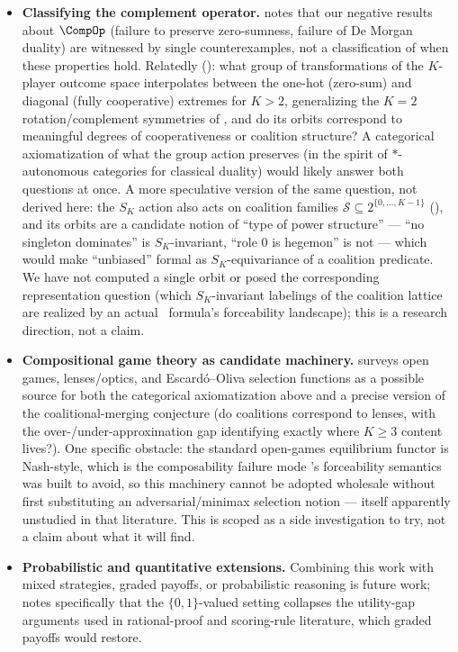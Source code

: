 \begin{itemize}
  \item \textbf{Classifying the complement operator.}
   notes that our negative results about
  $\CompOp$ (failure to preserve zero-sumness, failure of De Morgan duality)
  are witnessed by single counterexamples, not a classification of when these
  properties hold. Relatedly (): what group of
  transformations of the $K$-player outcome space interpolates between the
  one-hot (zero-sum) and diagonal (fully cooperative) extremes for $K>2$,
  generalizing the $K=2$ rotation/complement symmetries of
  , and do its orbits correspond to meaningful degrees of
  cooperativeness or coalition structure? A categorical axiomatization of what
  the group action preserves (in the spirit of $*$-autonomous categories for
  classical duality) would likely answer both questions at once. A more
  speculative version of the same question, not derived here: the $S_K$
  action also acts on coalition families
  $\mathcal S\subseteq 2^{\{0,\dots,K-1\}}$
  (), and its orbits are a candidate
  notion of ``type of power structure'' --- ``no singleton dominates'' is
  $S_K$-invariant, ``role 0 is hegemon'' is not --- which would make
  ``unbiased'' formal as $S_K$-equivariance of a coalition predicate. We have
  not computed a single orbit or posed the corresponding representation
  question (which $S_K$-invariant labelings of the coalition lattice are
  realized by an actual \KFOL\ formula's forceability landscape); this is a
  research direction, not a claim.

  \item \textbf{Compositional game theory as candidate machinery.}
   surveys open games, lenses/optics, and
  Escard\'o--Oliva selection functions as a possible source for both the
  categorical axiomatization above and a precise version of the
  coalitional-merging conjecture (do coalitions correspond to lenses, with
  the over-/under-approximation gap identifying exactly where $K\ge3$ content
  lives?). One specific obstacle: the standard open-games equilibrium functor
  is Nash-style, which is the composability failure mode \KFOL's forceability
  semantics was built to avoid, so this machinery cannot be adopted wholesale
  without first substituting an adversarial/minimax selection notion ---
  itself apparently unstudied in that literature. This is scoped as a side
  investigation to try, not a claim about what it will find.

  \item \textbf{Probabilistic and quantitative extensions.} Combining this
  work with mixed strategies, graded payoffs, or probabilistic reasoning is
  future work;  notes specifically that the
  $\{0,1\}$-valued setting collapses the utility-gap arguments used in
  rational-proof and scoring-rule literature, which graded payoffs would
  restore.
\end{itemize}
